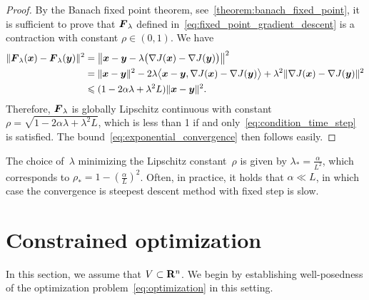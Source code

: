 \begin{proof}
    By the Banach fixed point theorem,
    see~\cref{theorem:banach_fixed_point},
    it is sufficient to prove that $\vect F_{\lambda}$ defined in~\eqref{eq:fixed_point_gradient_descent} is a contraction with constant $\rho \in (0, 1)$.
    We have
    \begin{align*}
        \norm{ \vect F_{\lambda}(\vect x) - \vect F_{\lambda}(\vect y) }^2
        &= \norm*{ \vect x - \vect y - \lambda \bigl(\nabla J(\vect x) - \nabla J(\vect y) \bigr) }^2 \\
        &= \norm{\vect x - \vect y}^2 - 2 \lambda \ip[\big]{\vect x - \vect y, \nabla J(\vect x) - \nabla J(\vect y)} + \lambda^2 \norm{\nabla J(\vect x) - \nabla J(\vect y)}^2 \\
        &\leq (1 - 2 \alpha \lambda + \lambda^2 L) \norm{\vect x - \vect y}^2.
    \end{align*}
    Therefore, $\vect F_{\lambda}$ is globally Lipschitz continuous with constant $\rho = \sqrt{1 - 2 \alpha \lambda + \lambda^2 L}$,
    which is less than 1 if and only~\eqref{eq:condition_time_step} is satisfied.
    The bound~\eqref{eq:exponential_convergence} then follows easily.
\end{proof}

\begin{remark}
    The choice of~$\lambda$ minimizing the Lipschitz constant~$\rho$ is given by $\lambda_* = \frac{\alpha}{L^2}$,
    which corresponds to $\rho_* = 1 - \left(\frac{\alpha}{L}\right)^2$.
    Often, in practice, it holds that $\alpha \ll L$,
    in which case the convergence is steepest descent method with fixed step is slow.
\end{remark}

\section{Constrained optimization}
\label{sec:constrained_optimization}

In this section,
we assume that $V \subset \real^n$.
We begin by establishing well-posedness of the optimization problem~\eqref{eq:optimization} in this setting.

